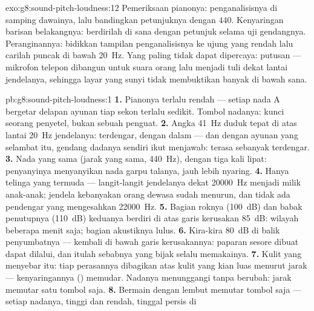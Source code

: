 \begin{solution}{exo:g8:sound-pitch-loudness:12}
Pemeriksaan pianonya: penganalisisnya di samping dawainya, lalu
bandingkan petunjuknya dengan $440$. Kenyaringan barisan belakangnya:
berdirilah di sana dengan petunjuk  selama uji gendangnya.
Peranginannya: bidikkan tampilan  penganalisisnya ke ujung
yang rendah lalu carilah puncak di bawah \qty{20}{Hz}. Yang paling
tidak dapat dipercaya: putusan  --- mikrofon telepon
dibangun untuk suara orang lalu menjadi tuli dekat lantai jendelanya,
sehingga layar yang sunyi tidak membuktikan banyak di bawah sana.
\end{solution}

\begin{solution}{pb:g8:sound-pitch-loudness:1}
\textbf{1.} Pianonya terlalu rendah --- setiap nada A bergetar delapan
ayunan tiap sekon terlalu sedikit. Tombol nadanya: kunci seorang
penyetel, bukan sebuah penguat.
\textbf{2.} Angka \qty{41}{Hz} duduk tepat di atas lantai
\qty{20}{Hz} jendelanya: terdengar, dengan dalam --- dan dengan ayunan
yang selambat itu, gendang dadanya sendiri ikut menjawab: terasa
sebanyak terdengar.
\textbf{3.} Nada yang sama (jarak yang sama, \qty{440}{Hz}), dengan
 tiga kali lipat: penyanyinya menyanyikan nada garpu talanya,
jauh lebih nyaring.
\textbf{4.} Hanya telinga yang termuda --- langit-langit jendelanya
dekat \qty{20000}{Hz} menjadi milik anak-anak; jendela kebanyakan
orang dewasa sudah menurun, dan tidak ada pendengar yang mengesahkan
\qty{22000}{Hz}.
\textbf{5.} Bagian roknya (\qty{100}{dB}) dan babak penutupnya
(\qty{110}{dB}) keduanya berdiri di atas garis kerusakan
\qty{85}{dB}: wilayah beberapa menit saja; bagian akustiknya lulus.
\textbf{6.} Kira-kira \qty{80}{dB} di balik penyumbatnya --- kembali
di bawah garis kerusakannya: paparan sesore dibuat dapat dilalui, dan
itulah sebabnya yang bijak selalu memakainya.
\textbf{7.} Kulit yang menyebar itu: tiap perasannya dibagikan atas
kulit yang kian luas menurut jarak --- kenyaringannya ()
memudar. Nadanya menunggangi tanpa berubah: jarak memutar satu tombol
saja.
\textbf{8.} Bermain dengan lembut memutar tombol  saja ---
 setiap nadanya, tinggi dan rendah, tinggal persis di

\end{solution}
